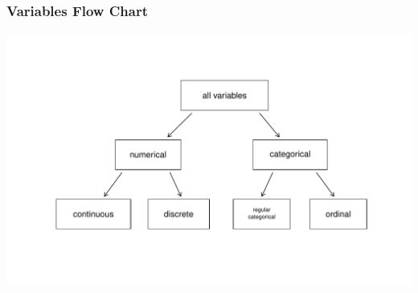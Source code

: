 \documentclass[slides]{beamer}\usepackage[]{graphicx}\usepackage[]{color}
\newenvironment{knitrout}{}{} %
\begin{document}
\begin{frame}[fragile]
\frametitle{Variables Flow Chart}
\begin{knitrout}
\color{fgcolor}
\includegraphics[width=\linewidth]{figure/flow-chart} 
\end{knitrout}

\end{frame}



%
%
%
\end{document}
